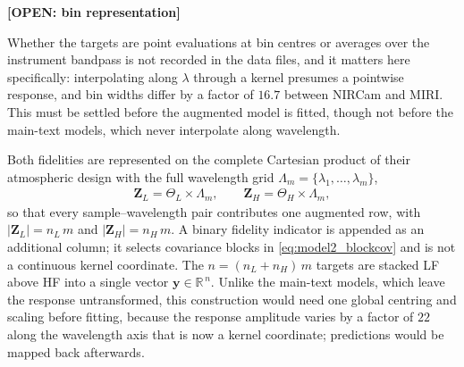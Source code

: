 \documentclass[12pt, letterpaper, oneside]{article}
\newcommand{\openitem}[2]{\par\begingroup\small\color{red!65!black}%
\noindent\textbf{[OPEN: #1]}\par\nobreak\noindent #2\par\endgroup}
\begin{document}
\openitem{bin representation}{Whether the targets are point evaluations at bin
centres or averages over the instrument bandpass is not recorded in the data
files, and it matters here specifically: interpolating along $\lambda$ through
a kernel presumes a pointwise response, and bin widths differ by a factor of
$16.7$ between NIRCam and MIRI. This must be settled before the augmented model
is fitted, though not before the main-text models, which never interpolate
along wavelength.}

Both fidelities are represented on the complete Cartesian product of
their atmospheric design with the full wavelength grid
$\Lambda_m=\{\lambda_1,\ldots,\lambda_m\}$,
\begin{align}
\label{eq:model2_designs_full}
    \mathbf{Z}_{L} = \Theta_{L}\times\Lambda_m, \qquad
    \mathbf{Z}_{H} = \Theta_{H}\times\Lambda_m,
\end{align}
so that every sample--wavelength pair contributes one augmented row, with
$|\mathbf{Z}_L| = n_L\,m$ and $|\mathbf{Z}_H| = n_H\,m$. A binary fidelity
indicator is appended as an additional column; it selects covariance blocks in
\eqref{eq:model2_blockcov} and is not a continuous kernel coordinate. The
$n = (n_L + n_H)\,m$ targets are stacked LF above HF into a single vector
$\mathbf{y}\in\mathbb{R}^{\,n}$. Unlike the main-text models, which leave the
response untransformed, this construction would need one global centring and
scaling before fitting, because the response amplitude varies by a factor of
$22$ along the wavelength axis that is now a kernel coordinate; predictions
would be mapped back afterwards.
\end{document}
